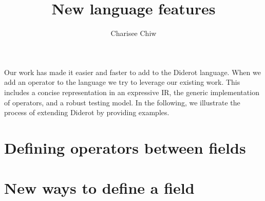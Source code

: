 \documentclass{article}
\title{New language features}
\author{Charisee Chiw}
\begin{document}
\maketitle 
Our work has made it easier and faster to add to the Diderot language.
When we add an operator to the language we try to leverage our existing work.
This includes a concise representation in an expressive IR, the generic implementation of operators, and a robust testing model.
In the following, we illustrate the process of extending Diderot by providing examples.

\section{Defining operators between fields}




\section{New ways to define a field}







 
\end{document}
